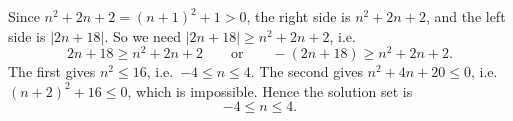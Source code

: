 Since $n^2+2n+2=(n+1)^2+1>0$, the right side is $n^2+2n+2$, and the left side is $|2n+18|$. So we need $|2n+18|\ge n^2+2n+2$, i.e.
\[
2n+18\ge n^2+2n+2\qquad\text{or}\qquad -(2n+18)\ge n^2+2n+2 .
\]
The first gives $n^2\le16$, i.e.\ $-4\le n\le4$. The second gives $n^2+4n+20\le0$, i.e.\ $(n+2)^2+16\le0$, which is impossible. Hence the solution set is
\[
\boxed{-4\le n\le4}.
\]

